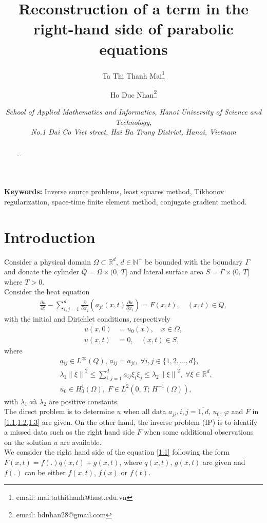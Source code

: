 \documentclass[]{article}
\title{Reconstruction of a term in the right-hand side of parabolic equations}
\author{Ta Thi Thanh Mai\thanks{email: mai.tathithanh@hust.edu.vn} \and Ho Duc Nhan\thanks{email: hdnhan28@gmail.com}}
\date{\footnotesize\textit{School of Applied Mathematics and Informatics, Hanoi University of Science and Technology, \\ No.1 Dai Co Viet street, Hai Ba Trung District, Hanoi, Vietnam}}
\begin{document}
\justifying
\maketitle
\begin{abstract}
	...
\end{abstract}
\textbf{Keywords:} Inverse source problems, least squares method, Tikhonov regularization, space-time finite element method, conjugate gradient method.
\section{Introduction}
Consider a physical domain $\Omega \subset \mathbb{R}^d,\, d\in \mathbb{N^+}$ be bounded with the boundary $\Gamma$ and donate the cylinder $Q=\Omega\times (0,\, T]$ and lateral surface area $S=\Gamma \times (0,\, T]$ where $T>0$. 
\\
Consider the heat equation
\begin{align}\label{1.1}
	\frac{\partial u}{\partial t}-\sum_{i, j=1}^{d}\frac{\partial}{\partial x_j}\left(a_{ji}(x, t)\frac{\partial u}{\partial x_i}\right)=F(x, t), \quad(x, t)\in Q,
\end{align}
with the initial and Dirichlet conditions, respectively
\begin{align}
	u(x, 0)&=u_0(x),\quad x\in \Omega,\label{1.2}\\
	u(x, t)&=0,\quad(x, t)\in S, \label{1.3}
\end{align}
where
\begin{align*}
	&a_{ij}\in L^{\infty}(Q),\, a_{ij}=a_{ji},\; \forall i, j\in \{1, 2, ..., d\},\\
	&\lambda_1\left\|\xi\right\|^2\leq \sum_{i, j=1}^{d}a_{ij}\xi_i\xi_j\leq \lambda_2\left\|\xi\right\|^2,\; \forall \xi\in\mathbb{R}^d,\\
	&u_0\in H^1_0(\Omega),\; F\in L^2(0,\, T;\, H^{-1}(\Omega)),
\end{align*}
with $\lambda_1$ và $\lambda_2$ are positive constants.
\\
The direct problem is to determine $u$ when all data $a_{ji}, i, j=\overline{1, d}, \,u_0, \,\varphi$ and $F$ in \cref{1.1,1.2,1.3} are given. On the other hand, the inverse problem (IP) is to identify a missed data such as the right hand side $F$ when some additional observations on the solution $u$ are available. 
\\
We consider the right hand side of the equation \eqref{1.1} following the form $F(x, t)=f(.)q(x, t)+g(x, t)$, where $q(x, t),\, g(x, t)$ are given and $f(.)$ can be either $f(x, t)$, $f(x)$ or $f(t)$.
\end{document}

